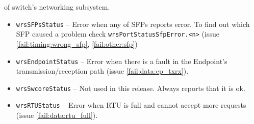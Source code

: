 \begin{itemize}
\begin{itemize}
	    of switch's networking subsystem.
	\begin{itemize}
	  \item \texttt{wrsSFPsStatus} -- Error when any of SFPs reports error.
		To find out which SFP caused a problem check
		\texttt{wrsPortStatusSfpError.<n>} (issue
		\ref{fail:timing:wrong_sfp}, \ref{fail:other:sfp})
	  \item \texttt{wrsEndpointStatus} -- Error when there is a fault in
		the Endpoint's transmission/reception path (issue
		\ref{fail:data:ep_txrx}).
	  \item \texttt{wrsSwcoreStatus} -- Not used in this release. Always
		reports that it is ok.
	  \item \texttt{wrsRTUStatus} -- Error when RTU is full and cannot
		accept more requests (issue \ref{fail:data:rtu_full}).


\end{itemize}
\end{itemize}
\end{itemize}

